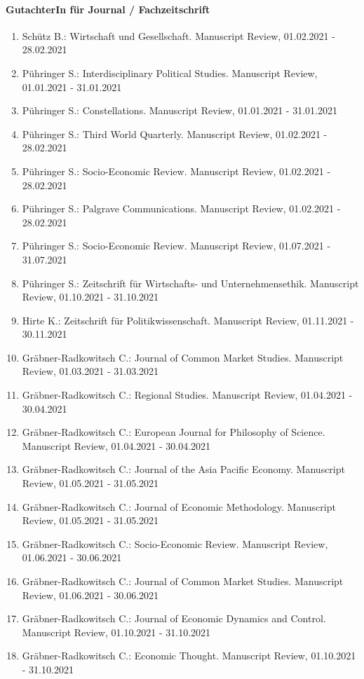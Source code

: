 \paragraph{GutachterIn für Journal / Fachzeitschrift} 
\begin{enumerate}[leftmargin=*, labelsep=0.5cm] 
 	 \item Schütz B.: Wirtschaft und Gesellschaft. Manuscript Review, 01.02.2021 - 28.02.2021 
	 \item Pühringer S.: Interdisciplinary Political Studies. Manuscript Review, 01.01.2021 - 31.01.2021 
	 \item Pühringer S.: Constellations. Manuscript Review, 01.01.2021 - 31.01.2021 
	 \item Pühringer S.: Third World Quarterly. Manuscript Review, 01.02.2021 - 28.02.2021 
	 \item Pühringer S.: Socio-Economic Review. Manuscript Review, 01.02.2021 - 28.02.2021 
	 \item Pühringer S.: Palgrave Communications. Manuscript Review, 01.02.2021 - 28.02.2021 
	 \item Pühringer S.: Socio-Economic Review. Manuscript Review, 01.07.2021 - 31.07.2021 
	 \item Pühringer S.: Zeitschrift für Wirtschafts- und Unternehmensethik. Manuscript Review, 01.10.2021 - 31.10.2021 
	 \item Hirte K.: Zeitschrift für Politikwissenschaft. Manuscript Review, 01.11.2021 - 30.11.2021 
	 \item Gräbner-Radkowitsch C.: Journal of Common Market Studies. Manuscript Review, 01.03.2021 - 31.03.2021 
	 \item Gräbner-Radkowitsch C.: Regional Studies. Manuscript Review, 01.04.2021 - 30.04.2021 
	 \item Gräbner-Radkowitsch C.: European Journal for Philosophy of Science. Manuscript Review, 01.04.2021 - 30.04.2021 
	 \item Gräbner-Radkowitsch C.: Journal of the Asia Pacific Economy. Manuscript Review, 01.05.2021 - 31.05.2021 
	 \item Gräbner-Radkowitsch C.: Journal of Economic Methodology. Manuscript Review, 01.05.2021 - 31.05.2021 
	 \item Gräbner-Radkowitsch C.: Socio-Economic Review. Manuscript Review, 01.06.2021 - 30.06.2021 
	 \item Gräbner-Radkowitsch C.: Journal of Common Market Studies. Manuscript Review, 01.06.2021 - 30.06.2021 
	 \item Gräbner-Radkowitsch C.: Journal of Economic Dynamics and Control. Manuscript Review, 01.10.2021 - 31.10.2021 
	 \item Gräbner-Radkowitsch C.: Economic Thought. Manuscript Review, 01.10.2021 - 31.10.2021 
\end{enumerate} 
